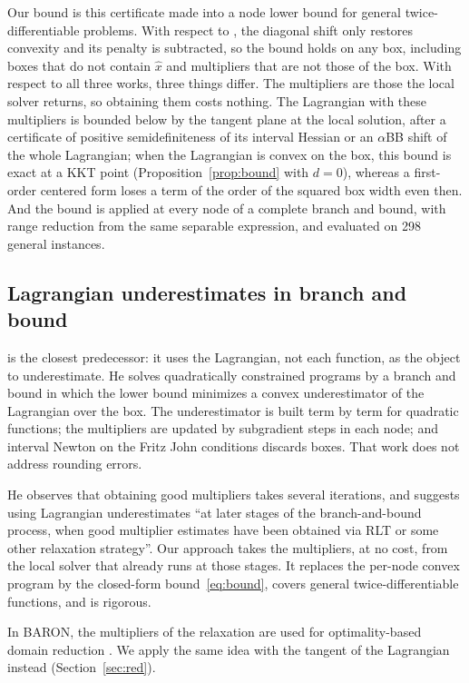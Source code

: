 \documentclass[11pt]{article}
\begin{document}
Our bound is this certificate made into a node lower bound for general
twice-differentiable problems. With respect to \citet{Neumaier1996}, the diagonal
shift only restores convexity and its penalty is subtracted, so the bound holds on any
box, including boxes that do not contain $\hat x$ and multipliers that are not those of
the box. With respect to all three works, three things differ. The multipliers are those the local
solver returns, so obtaining them costs nothing. The Lagrangian with these
multipliers is bounded below by the tangent plane at the local solution, after a
certificate of positive semidefiniteness of its interval Hessian or an $\alpha$BB shift
of the whole Lagrangian; when the Lagrangian is convex on the box, this bound is exact
at a KKT point (Proposition~\ref{prop:bound} with $d = 0$), whereas a first-order
centered form loses a term of the order of the squared box width even then. And the
bound is applied at every node of a complete branch and bound, with range reduction
from the same separable expression, and evaluated on 298 general instances.

\subsection{Lagrangian underestimates in branch and bound}

\citet{VanVoorhis2002} is the closest predecessor: it uses the Lagrangian, not each
function, as the object to underestimate. He solves quadratically constrained programs
by a branch and bound in which the lower bound minimizes a convex underestimator of the
Lagrangian over the box. The underestimator is built term by term for quadratic
functions; the multipliers are updated by subgradient steps in each node; and interval
Newton on the Fritz John conditions discards boxes. That work does not address rounding
errors.

He observes that obtaining good multipliers takes several iterations, and suggests
using Lagrangian underestimates ``at later stages of the branch-and-bound process, when
good multiplier estimates have been obtained via RLT or some other relaxation
strategy''. Our approach takes the multipliers, at no cost, from the local solver that
already runs at those stages. It replaces the per-node convex program by the
closed-form bound~\eqref{eq:bound}, covers general twice-differentiable functions, and
is rigorous.

In BARON, the multipliers of the relaxation are used for optimality-based domain
reduction \citep{RyooSahinidis1996}. We apply the same idea with the tangent of
the Lagrangian instead (Section~\ref{sec:red}).
\end{document}
